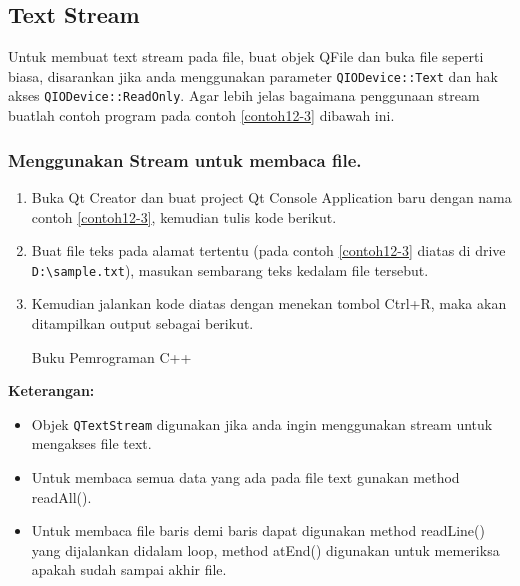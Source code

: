 \subsection{Text Stream}\label{text-stream}

Untuk membuat text stream pada file, buat objek QFile dan buka file
seperti biasa, disarankan jika anda menggunakan parameter
\texttt{QIODevice::Text} dan hak akses \texttt{QIODevice::ReadOnly}.
Agar lebih jelas bagaimana penggunaan stream buatlah contoh program pada
contoh \ref{contoh12-3} dibawah ini.

\subsubsection*{Menggunakan Stream untuk membaca file.}

\begin{enumerate}

\item
  Buka Qt Creator dan buat project Qt Console Application baru dengan
  nama contoh \ref{contoh12-3}, kemudian tulis kode berikut.


\item
  Buat file teks pada alamat tertentu (pada contoh \ref{contoh12-3} diatas di drive
  \texttt{D:\textbackslash{}sample.txt}), masukan sembarang teks kedalam
  file tersebut.
\item
  Kemudian jalankan kode diatas dengan menekan tombol Ctrl+R, maka akan
  ditampilkan output sebagai berikut.
  
  \begin{lcverbatim}
Buku Pemrograman C++
  \end{lcverbatim}
\end{enumerate}

\textbf{Keterangan:}

\begin{itemize}

\item
  Objek \texttt{QTextStream} digunakan jika anda ingin menggunakan
  stream untuk mengakses file text.
\item
  Untuk membaca semua data yang ada pada file text gunakan method
  readAll().
\item
  Untuk membaca file baris demi baris dapat digunakan method readLine()
  yang dijalankan didalam loop, method atEnd() digunakan untuk memeriksa
  apakah sudah sampai akhir file.
\end{itemize}


